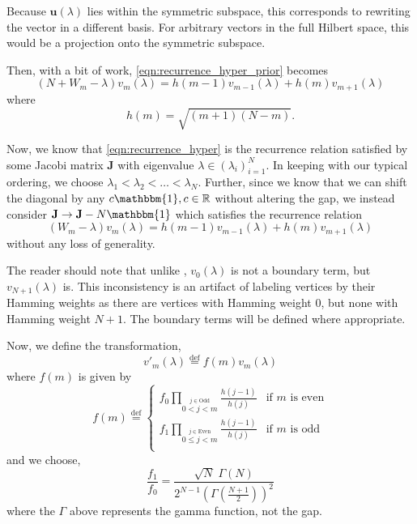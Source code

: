     Because $\mathbf{u}(\lambda)$ lies within the symmetric subspace, this corresponds to rewriting the vector in a different basis. For arbitrary vectors in the full Hilbert space, this would be a projection onto the symmetric subspace.

Then, with a bit of work, \cref{eqn:recurrence_hyper_prior} becomes
    \begin{equation}\label{eqn:recurrence_hyper}
    	(N+W_m-\lambda)v_m(\lambda) = h(m-1)v_{m-1}(\lambda) + h(m)v_{m+1}(\lambda)
    \end{equation}
    where
    \begin{equation}
    	h(m) = \sqrt{(m+1)(N-m)}.
    \end{equation}

    Now, we know that \cref{eqn:recurrence_hyper} is the recurrence relation satisfied by some Jacobi matrix $\mathbf{J}$ with eigenvalue $\lambda \in (\lambda_i)_{i=1}^N$. In keeping with our typical ordering, we choose $\lambda_1 < \lambda_2 < \dots <\lambda_N$. Further, since we know that we can shift the diagonal by any $c \mathbbm{1}, c \in \mathbb{R}$ without altering the gap, we instead consider $\mathbf{J}\rightarrow \mathbf{J} -N\mathbbm{1}$ which satisfies the recurrence relation
    \begin{equation}\label{eqn:recurrence_hyper2}
    	(W_m-\lambda)v_m(\lambda) = h(m-1)v_{m-1}(\lambda) + h(m)v_{m+1}(\lambda)
    \end{equation}
    without any loss of generality.

    \begin{remark}
    	The reader should note that unlike , $v_0(\lambda)$ is not a boundary term, but $v_{N+1}(\lambda)$ is. This inconsistency is an artifact of labeling vertices by their Hamming weights as there are vertices with Hamming weight $0$, but none with Hamming weight $N+1$. The boundary terms will be defined where appropriate.
    \end{remark}

    Now, we define the transformation,
    \begin{equation}\label{eqn:trans}
    	v'_m(\lambda) \stackrel{\text{def}}{=} f(m) v_m(\lambda)
    \end{equation}
    where $f(m)$ is given by
    \begin{equation}
      f(m) \stackrel{\text{def}}{=} \begin{cases}
      f_0 \prod_{\stackrel{j\in\text{Odd}}{0<j<m}}\frac{h(j-1)}{h(j)} & \text{if $m$ is even} \\
      f_1 \prod_{\stackrel{j\in\text{Even}}{0\leq j<m}}\frac{h(j-1)}{h(j)} & \text{if $m$ is odd} \\
      \end{cases}
    \end{equation}
    and we choose,
    \begin{equation}
    	\frac{f_1}{f_0}= \frac{\sqrt{N}\;\Gamma(N)}{2^{N-1}(\Gamma(\frac{N+1}{2}))^2}
    \end{equation}
    where the $\Gamma$ above represents the gamma function, not the gap.

